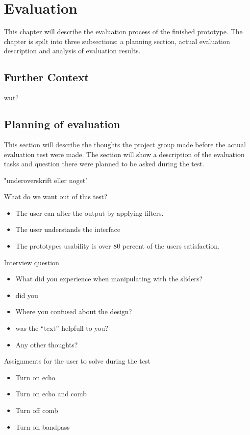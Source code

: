 \chapter{Evaluation}\label{ch:evaluation}
This chapter will describe the evaluation process of the finished prototype. The chapter is spilt into three subsections: a planning section, actual evaluation description and analysis of evaluation results. 

\section{Further Context}\label{sec:furthercontext}
 wut?

\section{Planning of evaluation}
This section will describe the thoughts the project group made before the actual evaluation test were made. The section will show a description of the evaluation tasks and question there were planned to be asked during the test. 

"underoverskrift eller noget" 

What do we want out of this test?

\begin{itemize}
\item The user can alter the output by applying filters.
\item The user understands the interface  
\item The prototypes usability is over 80 percent of the users satisfaction.
\end{itemize}

Interview question 
\begin{itemize}
\item What did you experience when manipulating with the sliders?
\item did you 
\item Where you confused about the design?
\item was the “text” helpfull to you?
\item Any other thoughts?
\end{itemize}

Assignments for the user to solve during the test 
\begin{itemize}
\item Turn on echo
\item Turn on echo and comb
\item Turn off comb
\item Turn on bandpass 
\end{itemize}


